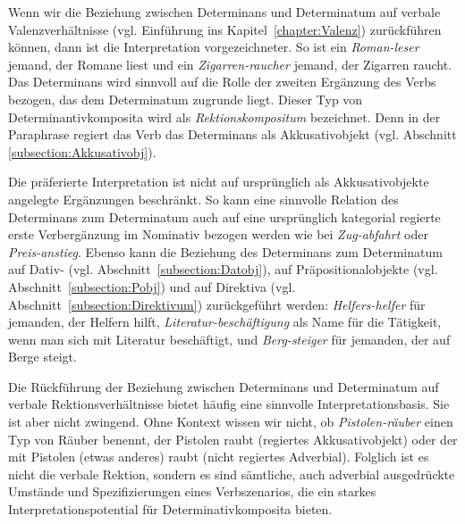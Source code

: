 Wenn wir die Beziehung zwischen Determinans und Determinatum auf verbale Valenzverhältnisse (vgl. Einführung ins Kapitel~\ref{chapter:Valenz}) zurückführen können, dann ist die Interpretation vorgezeichneter. So ist ein \textit{Roman-leser} jemand, der Romane liest und ein \textit{Zigarren-raucher} jemand, der Zigarren raucht. Das Determinans wird sinnvoll auf die Rolle der zweiten Ergänzung des Verbs bezogen, das dem Determinatum zugrunde liegt. Dieser Typ von Determinantivkomposita wird als \textit{Rektionskompositum} bezeichnet. Denn in der Paraphrase regiert das Verb das Determinans als Akkusativobjekt (vgl. Abschnitt \ref{subsection:Akkusativobj}). 

Die präferierte Interpretation ist nicht auf ursprünglich als Akkusativobjekte angelegte Ergänzungen beschränkt. So kann eine sinnvolle Relation des Determinans zum Determinatum auch auf eine ursprünglich kategorial regierte erste Verbergänzung im Nominativ bezogen werden wie bei \textit{Zug-abfahrt} oder \textit{Preis-anstieg}. Ebenso kann die Beziehung des Determinans zum Determinatum auf Dativ- (vgl. Abschnitt~\ref{subsection:Datobj}), auf Präpositionalobjekte (vgl. Abschnitt~\ref{subsection:Pobj}) und auf Direktiva (vgl. Abschnitt~\ref{subsection:Direktivum}) zurückgeführt werden: \textit{Helfers-helfer} für jemanden, der Helfern hilft, \textit{Literatur-beschäftigung} als Name für die Tätigkeit, wenn man sich mit Literatur beschäftigt, und \textit{Berg-steiger} für jemanden, der auf Berge steigt.    

Die Rückführung der Beziehung zwischen Determinans und Determinatum auf verbale Rektionsverhältnisse bietet häufig eine sinnvolle Interpretationsbasis. Sie ist aber nicht zwingend. Ohne Kontext wissen wir nicht, ob \textit{Pistolen-räuber} einen Typ von Räuber benennt, der Pistolen raubt (regiertes Akkusativobjekt) oder der mit Pistolen (etwas anderes) raubt (nicht regiertes Adverbial). Folglich ist es nicht die verbale Rektion, sondern es sind sämtliche, auch adverbial ausgedrückte Umstände und Spezifizierungen eines Verbszenarios, die ein starkes Interpretationspotential für Determinativkomposita bieten. 

